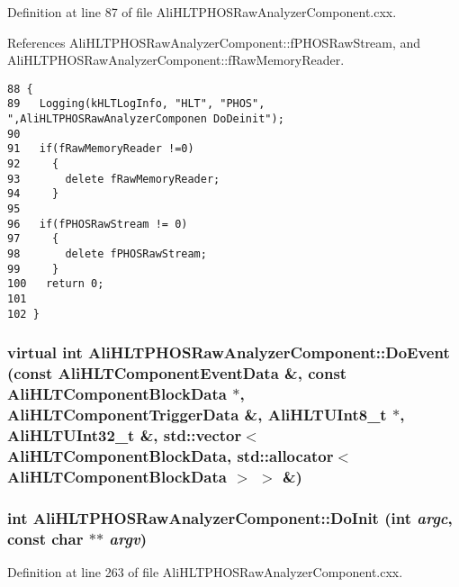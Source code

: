 Definition at line 87 of file Ali\-HLTPHOSRaw\-Analyzer\-Component.cxx.

References Ali\-HLTPHOSRaw\-Analyzer\-Component::f\-PHOSRaw\-Stream, and Ali\-HLTPHOSRaw\-Analyzer\-Component::f\-Raw\-Memory\-Reader.

\footnotesize\begin{verbatim}88 {
89   Logging(kHLTLogInfo, "HLT", "PHOS", ",AliHLTPHOSRawAnalyzerComponen DoDeinit");
90 
91   if(fRawMemoryReader !=0)
92     {
93       delete fRawMemoryReader;
94     }
95     
96   if(fPHOSRawStream != 0)
97     {
98       delete fPHOSRawStream;
99     }
100   return 0;
101 
102 }
\end{verbatim}\normalsize 


\subsubsection{\setlength{\rightskip}{0pt plus 5cm}virtual int Ali\-HLTPHOSRaw\-Analyzer\-Component::Do\-Event (const Ali\-HLTComponent\-Event\-Data \&, const Ali\-HLTComponent\-Block\-Data $\ast$, Ali\-HLTComponent\-Trigger\-Data \&, Ali\-HLTUInt8\_\-t $\ast$, Ali\-HLTUInt32\_\-t \&, std::vector$<$ Ali\-HLTComponent\-Block\-Data, std::allocator$<$ Ali\-HLTComponent\-Block\-Data $>$ $>$ \&)\hspace{0.3cm}{\tt  [virtual, inherited]}}\label{classAliHLTPHOSRawAnalyzerComponent_AliHLTPHOSRawAnalyzerPeakFinderComponenta16}


\subsubsection{\setlength{\rightskip}{0pt plus 5cm}int Ali\-HLTPHOSRaw\-Analyzer\-Component::Do\-Init (int {\em argc}, const char $\ast$$\ast$ {\em argv})\hspace{0.3cm}{\tt  [virtual, inherited]}}\label{classAliHLTPHOSRawAnalyzerComponent_AliHLTPHOSRawAnalyzerPeakFinderComponenta4}




Definition at line 263 of file Ali\-HLTPHOSRaw\-Analyzer\-Component.cxx.

